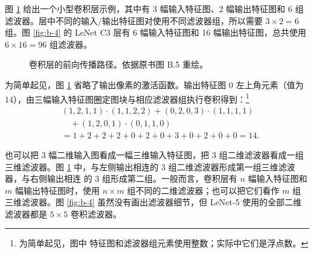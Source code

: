 图 \ref{fig:b-5} 给出一个小型卷积层示例，其中有 3 幅输入特征图、2 幅输出特征图和 6 组
滤波器。层中不同的输入/输出特征图对使用不同滤波器组，所以需要 $3\times2=6$ 组。图
\ref{fig:b-4} 的 LeNet C3 层有 6 幅输入特征图和 16 幅输出特征图，总共使用
$6\times16=96$ 组滤波器。

\begin{figure}[htbp]
  \centering
  \caption{卷积层的前向传播路径。依据原书图 B.5 重绘。}
  \label{fig:b-5}
\end{figure}

为简单起见，图 \ref{fig:b-5} 省略了输出像素的激活函数。输出特征图 0 左上角元素（值为
14），由三幅输入特征图圈定图块与相应滤波器组执行卷积得到：\footnote{为简单起见，图中
特征图和滤波器组元素使用整数；实际中它们是浮点数。}
\begin{equation}
\begin{aligned}
 &(1,2,1,1)\cdot(1,1,2,2)+(0,2,0,3)\cdot(1,1,1,1)\\
 &\quad +(1,2,0,1)\cdot(0,1,1,0)\\
 &=1+2+2+2+0+2+0+3+0+2+0+0=14.
\end{aligned}
\label{eq:appb-20}
\end{equation}

也可以把 3 幅二维输入图看成一幅三维输入特征图，把 3 组二维滤波器看成一组三维滤波器。图
\ref{fig:b-5} 中，与左侧输出相连的 3 组二维滤波器形成第一组三维滤波器，与右侧输出相连
的 3 组形成第二组。一般而言，卷积层有 $n$ 幅输入特征图和 $m$ 幅输出特征图时，使用
$n\times m$ 组不同的二维滤波器；也可以把它们看作 $m$ 组三维滤波器。图 \ref{fig:b-4}
虽然没有画出滤波器细节，但 LeNet-5 使用的全部二维滤波器都是 $5\times5$ 卷积滤波器。

